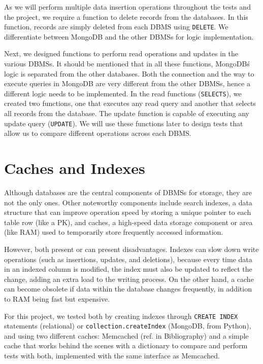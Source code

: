 \documentclass[11pt,a4paper]{article}
\begin{document}
As we will perform multiple data insertion operations throughout the tests and the project, we require a function to delete records from the databases. In this function, records are simply deleted from each DBMS using \texttt{DELETE}. We differentiate between MongoDB and the other DBMSs for logic implementation.

Next, we designed functions to perform read operations and updates in the various DBMSs. It should be mentioned that in all these functions, MongoDB\'s logic is separated from the other databases. Both the connection and the way to execute queries in MongoDB are very different from the other DBMSs, hence a different logic needs to be implemented. In the read functions (\texttt{SELECTS}), we created two functions, one that executes any read query and another that selects all records from the database. The update function is capable of executing any update query (\texttt{UPDATE}). We will use these functions later to design tests that allow us to compare different operations across each DBMS.

\section{Caches and Indexes}
Although databases are the central components of DBMSs for storage, they are not the only ones. Other noteworthy components include search indexes, a data structure that can improve operation speed by storing a unique pointer to each table row (like a PK), and caches, a high-speed data storage component or area (like RAM) used to temporarily store frequently accessed information.

However, both present or can present disadvantages. Indexes can slow down write operations (such as insertions, updates, and deletions), because every time data in an indexed column is modified, the index must also be updated to reflect the change, adding an extra load to the writing process. On the other hand, a cache can become obsolete if data within the database changes frequently, in addition to RAM being fast but expensive.

For this project, we tested both by creating indexes through \texttt{CREATE INDEX} statements (relational) or \texttt{collection.createIndex} (MongoDB, from Python), and using two different caches: Memcached (ref. in Bibliography) and a simple cache that works behind the scenes with a dictionary to compare and perform tests with both, implemented with the same interface as Memcached.
\end{document}
